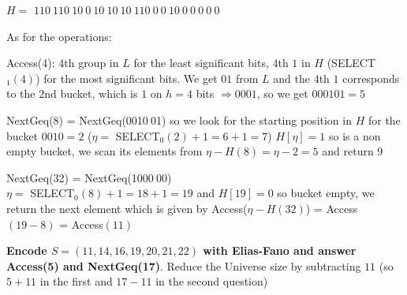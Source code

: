 \documentclass[10pt]{report}
\begin{document}
\begin{list}{}{}
\begin{list}{}{}
		\item[$H =$] $110\:110\:10\:0\:10\:10\:10\:110\:0\:0\:10\:0\:0\:0\:0\:0$
	\end{list}
	As for the operations:
	\begin{list}{}{}
		\item Access(4): $4$th group in $L$ for the least significant bits, $4$th $1$ in $H$ (SELECT$_1(4)$) for the most significant bits. We get $01$ from $L$ and the $4$th $1$ corresponds to the $2$nd bucket, which is $1$ on $h = 4$ bits $\Rightarrow 0001$, so we get $000101 = 5$
		\item NextGeq(8) = NextGeq(0010$\:$01) so we look for the starting position in $H$ for the bucket $0010 = 2$ ($\eta =$ SELECT$_0(2)+1 = 6+1 = 7$) $H[\eta] = 1$ so is a non empty bucket, we scan its elements from $\eta - H(8) = \eta - 2 = 5$ and return 9
		\item NextGeq(32) = NextGeq(1000$\:$00)\\
		$\eta =$ SELECT$_0(8) + 1 = 18+1 = 19$ and $H[19] = 0$ so bucket empty, we return the next element which is given by Access($\eta-H(32)$) = Access$(19-8)$ = Access$(11)$
	\end{list}
	\item \textbf{Encode $S=(11,14,16,19,20,21,22)$ with Elias-Fano and answer Access(5) and NextGeq(17)}. Reduce the Universe size by subtracting $11$ (so $5+11$ in the first and $17-11$ in the second question)
\end{list}
\end{document}
